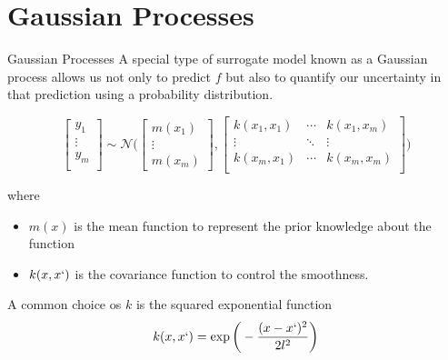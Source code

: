 \documentclass{beamer}
\begin{document}
\section{Gaussian Processes}
\begin{frame}{Gaussian Processes}
A special type of surrogate model known as a Gaussian process allows us not only to predict $f$ but also to quantify our uncertainty in that prediction using a probability distribution.

\begin{equation*}
    \begin{bmatrix} 
    y_1\\
    \vdots\\
    y_m\\
    \end{bmatrix}
    \sim \mathcal{N}\bigg(
    \begin{bmatrix}
    m(x_1) \\
    \vdots \\
    m(x_m)
    \end{bmatrix},
    \begin{bmatrix}
    k(x_1, x_1) & \cdots & k(x_1, x_m)\\
    \vdots & \ddots & \vdots \\
    k(x_m, x_1) & \cdots & k(x_m, x_m)\\
    \end{bmatrix}
    \bigg)
\end{equation*}

where 
\begin{itemize}
    \item $m(x)$ is the mean function to represent the prior knowledge about the function
    \item $k(x, x`)$ is the covariance function to control the smoothness.
\end{itemize}
A common choice os $k$ is the squared exponential function
\begin{equation*}
    k(x, x`) = \exp\bigg(-\frac{(x-x`)^2}{2l^2}\bigg)
\end{equation*}
\end{frame}
\end{document}
